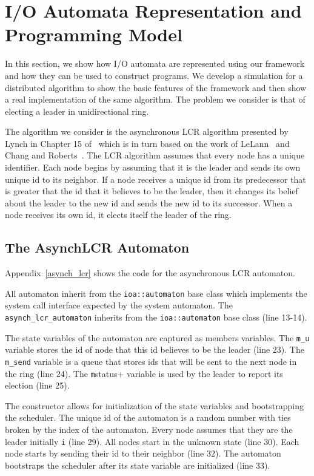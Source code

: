 \section{I/O Automata Representation and Programming Model\label{representation}}

In this section, we show how I/O automata are represented using our framework and how they can be used to construct programs.
We develop a simulation for a distributed algorithm to show the basic features of the framework and then show a real implementation of the same algorithm.
The problem we consider is that of electing a leader in unidirectional ring.

The algorithm we consider is the asynchronous LCR algorithm presented by Lynch in Chapter 15 of~\cite{lynch1996distributed} which is in turn based on the work of LeLann~\cite{} and Chang and Roberts~\cite{}.
The LCR algorithm assumes that every node has a unique identifier.
Each node begins by assuming that it is the leader and sends its own unique id to its neighbor.
If a node receives a unique id from its predecessor that is greater that the id that it believes to be the leader, then it changes its belief about the leader to the new id and sends the new id to its successor.
When a node receives its own id, it elects itself the leader of the ring.

\subsection{The AsynchLCR Automaton}

Appendix~\ref{asynch_lcr} shows the code for the asynchronous LCR automaton.

All automaton inherit from the \verb+ioa::automaton+ base class which implements the system call interface expected by the system automaton.
The \verb+asynch_lcr_automaton+ inherits from the \verb+ioa::automaton+ base class (line 13-14).

The state variables of the automaton are captured as members variables.
The \verb+m_u+ variable stores the id of node that this id believes to be the leader (line 23).
The \verb+m_send+ variable is a queue that stores ids that will be sent to the next node in the ring (line 24).
The \verb+m+status+ variable is used by the leader to report its election (line 25).

The constructor allows for initialization of the state variables and bootstrapping the scheduler.
The unique id of the automaton is a random number with ties broken by the index of the automaton.
Every node assumes that they are the leader initially \verb+i+ (line 29).
All nodes start in the unknown state (line 30).
Each node starts by sending their id to their neighbor (line 32).
The automaton bootstraps the scheduler after its state variable are initialized (line 33).

